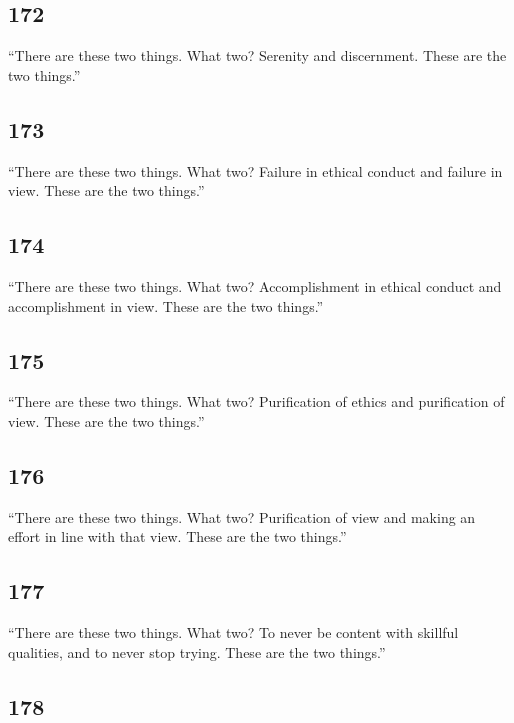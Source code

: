 \documentclass[12pt,openany]{book}%
\begin{document}
\subsection*{172 }

“There are these two things. What two? Serenity and discernment. These are the two things.” 

\subsection*{173 }

“There are these two things. What two? Failure in ethical conduct and failure in view. These are the two things.” 

\subsection*{174 }

“There are these two things. What two? Accomplishment in ethical conduct and accomplishment in view. These are the two things.” 

\subsection*{175 }

“There are these two things. What two? Purification of ethics and purification of view. These are the two things.” 

\subsection*{176 }

“There are these two things. What two? Purification of view and making an effort in line with that view. These are the two things.” 

\subsection*{177 }

“There are these two things. What two? To never be content with skillful qualities, and to never stop trying. These are the two things.” 

\subsection*{178 }
\end{document}
